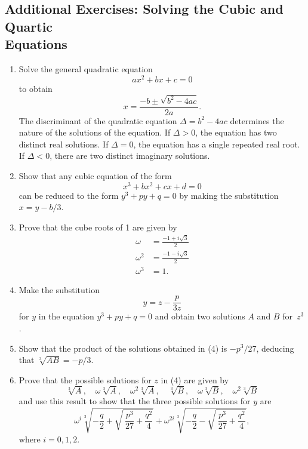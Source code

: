 \subsection*{Additional Exercises:  Solving the Cubic and Quartic \\
Equations}

{\small
 
\begin{enumerate}
 
\item
Solve the general quadratic equation 
\[
ax^2 + bx + c = 0
\]
to obtain
\[
x = \frac{-b \pm \sqrt{b^2 - 4ac}}{2a}.
\]
The {\bfi discriminant\/} of the quadratic equation $\Delta = b^2 - 4ac$ determines the nature of the solutions of the equation.  If $\Delta > 0$, the equation has two distinct real solutions.  If $\Delta = 0$, the equation has a single repeated real root. If $\Delta < 0$, there are two distinct imaginary solutions. 

\item
Show that any cubic equation of the form
\[
x^3 + bx^2 + cx + d = 0
\]
can be reduced to the form $y^3 + py + q = 0$ by making the substitution $x = y - b/3$.

\item
Prove that the cube roots of 1 are given by
\begin{align*}
\omega & = \frac{-1+ i \sqrt{3}}{2} \\
\omega^2 & = \frac{-1- i \sqrt{3}}{2} \\
\omega^3 & = 1.
\end{align*}

\item
Make the substitution 
\[
y = z - \frac{p}{3 z}
\]
for $y$ in the equation $y^3 + py + q = 0$ and obtain two solutions $A$ and $B$ for~$z^3$.

\item
Show that the product of the solutions obtained in (4) is $-p^3/27$, deducing that $\sqrt[3]{A B} = -p/3$.

\item 
Prove that the possible solutions for $z$ in (4) are given by 
\[
\sqrt[3]{A}, \quad \omega \sqrt[3]{A}, \quad \omega^2 \sqrt[3]{A}, \quad
\sqrt[3]{B}, \quad \omega \sqrt[3]{B}, \quad \omega^2 \sqrt[3]{B}
\]
and use this result to show that the three possible solutions for $y$
are
\[
\omega^i \sqrt[3]{-\frac{q}{2}+ \sqrt{\ \frac{p^3}{27}  + \frac{q^2}{4}}  } +
\omega^{2i} \sqrt[3]{-\frac{q}{2}- \sqrt{\ \frac{p^3}{27}  + \frac{q^2}{4}}  },
\]
where $i = 0, 1, 2$.
 

\end{enumerate}}
